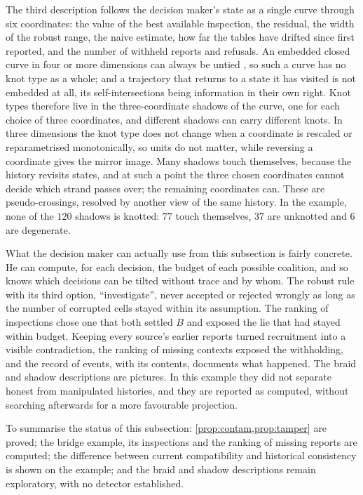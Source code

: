 \documentclass[11pt]{article}
\theoremstyle{definition}\newtheorem{definition}[theorem]{Definition}\newtheorem{remark}[theorem]{Remark}\newtheorem{example}[theorem]{Example}\newtheorem{problem}[theorem]{Open problem}\crefname{problem}{Problem}{Problems}
\begin{document}
The third description follows the decision maker's state as a single curve through six coordinates: the value of the best available inspection, the residual, the width of the robust range, the naive estimate, how far the tables have drifted since first reported, and the number of withheld reports and refusals. An embedded closed curve in four or more dimensions can always be untied \cite{Rolfsen1976}, so such a curve has no knot type as a whole; and a trajectory that returns to a state it has visited is not embedded at all, its self-intersections being information in their own right. Knot types therefore live in the three-coordinate shadows of the curve, one for each choice of three coordinates, and different shadows can carry different knots. In three dimensions the knot type does not change when a coordinate is rescaled or reparametrised monotonically, so units do not matter, while reversing a coordinate gives the mirror image. Many shadows touch themselves, because the history revisits states, and at such a point the three chosen coordinates cannot decide which strand passes over; the remaining coordinates can. These are pseudo-crossings, resolved by another view of the same history. In the example, none of the $120$ shadows is knotted: $77$ touch themselves, $37$ are unknotted and $6$ are degenerate.

What the decision maker can actually use from this subsection is fairly concrete. He can compute, for each decision, the budget of each possible coalition, and so knows which decisions can be tilted without trace and by whom. The robust rule with its third option, ``investigate'', never accepted or rejected wrongly as long as the number of corrupted cells stayed within its assumption. The ranking of inspections chose one that both settled $B$ and exposed the lie that had stayed within budget. Keeping every source's earlier reports turned recruitment into a visible contradiction, the ranking of missing contexts exposed the withholding, and the record of events, with its contents, documents what happened. The braid and shadow descriptions are pictures. In this example they did not separate honest from manipulated histories, and they are reported as computed, without searching afterwards for a more favourable projection.

To summarise the status of this subsection: \cref{prop:contam,prop:tamper} are proved; the bridge example, its inspections and the ranking of missing reports are computed; the difference between current compatibility and historical consistency is shown on the example; and the braid and shadow descriptions remain exploratory, with no detector established.
\end{document}
